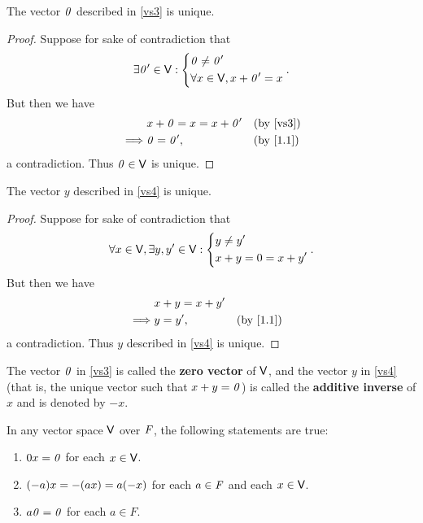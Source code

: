 \begin{cor}\label{1.2.14}
	The vector \(\mathit{0}\) described in \ref{vs3} is unique.
\end{cor}

\begin{proof}
	Suppose for sake of contradiction that
	\[
		\exists \mathit{0}' \in \mathsf{V} : \begin{dcases}
			\mathit{0} \neq \mathit{0}' \\
			\forall x \in \mathsf{V}, x + \mathit{0}' = x
		\end{dcases}.
	\]
	But then we have
	\begin{align*}
		         & x + \zv = x = x + \zv' &  & \text{(by \ref{vs3})}  \\
		\implies & \zv = \zv',            &  & \text{(by \cref{1.1})}
	\end{align*}
	a contradiction.
	Thus \(\mathit{0} \in \mathsf{V}\) is unique.
\end{proof}

\begin{cor}\label{1.2.15}
	The vector \(y\) described in \ref{vs4} is unique.
\end{cor}

\begin{proof}
	Suppose for sake of contradiction that
	\[
		\forall x \in \mathsf{V}, \exists y, y' \in \mathsf{V} : \begin{dcases}
			y \neq y' \\
			x + y = 0 = x + y'
		\end{dcases}.
	\]
	But then we have
	\begin{align*}
		         & x + y = x + y'                             \\
		\implies & y = y',        &  & \text{(by \cref{1.1})}
	\end{align*}
	a contradiction.
	Thus \(y\) described in \ref{vs4} is unique.
\end{proof}

\begin{defn}\label{1.2.16}
	The vector \(\mathit{0}\) in \ref{vs3} is called the \textbf{zero vector} of \(\mathsf{V}\), and the vector \(y\) in \ref{vs4} (that is, the unique vector such that \(x + y = \mathit{0}\)) is called the \textbf{additive inverse} of \(x\) and is denoted by \(-x\).
\end{defn}

\begin{thm}\label{1.2}
	In any vector space \(\mathsf{V}\) over \(\mathit{F}\), the following statements are true:
	\begin{enumerate}
		\item \(0x = \mathit{0}\) for each \(x \in \mathsf{V}\).
		\item \(\p{-a}x = -\p{ax} = a\p{-x}\) for each \(a \in \mathit{F}\) and each \(x \in \mathsf{V}\).
		\item \(a\mathit{0} = \mathit{0}\) for each \(a \in F\).
	\end{enumerate}
\end{thm}

